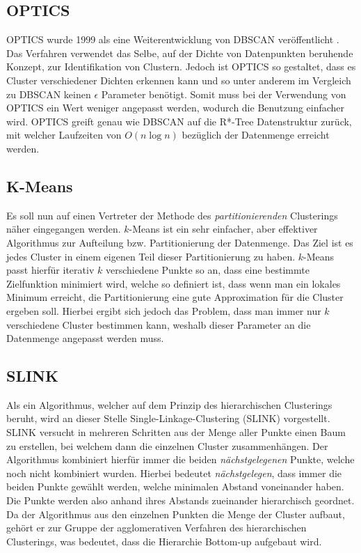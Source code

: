 \documentclass{lni}
\begin{document}

\subsection{OPTICS}
OPTICS wurde 1999 als eine Weiterentwicklung von DBSCAN veröffentlicht \cite{OPTICS}. Das Verfahren verwendet das Selbe, auf der Dichte von Datenpunkten beruhende Konzept, zur Identifikation von Clustern. Jedoch ist OPTICS so gestaltet, dass es Cluster verschiedener Dichten erkennen kann und so unter anderem im Vergleich zu DBSCAN keinen $\epsilon$ Parameter benötigt. Somit muss bei der Verwendung von OPTICS ein Wert weniger angepasst werden, wodurch die Benutzung einfacher wird. OPTICS greift genau wie DBSCAN auf die R*-Tree Datenstruktur zurück, mit welcher Laufzeiten von $O(n\log n)$ bezüglich der Datenmenge erreicht werden.


\subsection{K-Means}
Es soll nun auf einen Vertreter der Methode des \textit{partitionierenden} Clusterings näher eingegangen werden. $k$-Means \cite{TOP10} ist ein sehr einfacher, aber effektiver Algorithmus zur Aufteilung bzw. Partitionierung der Datenmenge. Das Ziel ist es jedes Cluster in einem eigenen Teil dieser Partitionierung zu haben. $k$-Means passt hierfür iterativ $k$ verschiedene Punkte so an, dass eine bestimmte Zielfunktion minimiert wird, welche so definiert ist, dass wenn man ein lokales Minimum erreicht, die Partitionierung eine gute Approximation für die Cluster ergeben soll. Hierbei ergibt sich jedoch das Problem, dass man immer nur $k$ verschiedene Cluster bestimmen kann, weshalb dieser Parameter an die Datenmenge angepasst werden muss.


\subsection{SLINK}
Als ein Algorithmus, welcher auf dem Prinzip des hierarchischen Clusterings beruht, wird an dieser Stelle Single-Linkage-Clustering  (SLINK) \cite{HIER} vorgestellt. SLINK versucht in mehreren Schritten aus der Menge aller Punkte einen Baum zu erstellen, bei welchem dann die einzelnen Cluster zusammenhängen. Der Algorithmus kombiniert hierfür immer die beiden \textit{nächstgelegenen} Punkte, welche noch nicht kombiniert wurden. Hierbei bedeutet \textit{nächstgelegen}, dass immer die beiden Punkte gewählt werden, welche minimalen Abstand voneinander haben. Die Punkte werden also anhand ihres Abstands zueinander hierarchisch geordnet. Da der Algorithmus aus den einzelnen Punkten die Menge der Cluster aufbaut, gehört er zur Gruppe der agglomerativen Verfahren des hierarchischen Clusterings, was bedeutet, dass die Hierarchie \glqq Bottom-up\grqq{} aufgebaut wird.
\end{document}
